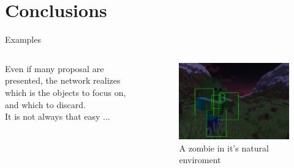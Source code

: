 \documentclass[english]{beamer}
\begin{document}
\section{Conclusions}
\begin{frame}{Examples}
	\begin{columns}
	    
	    \begin{column}{0.5\textwidth}
	    Even if many proposal are presented, the network realizes which is the objects to focus on, and which to discard. \\ 
               It is not always that easy ...
	
	    \end{column}
	
	    \begin{column}{0.5\textwidth}
	      \begin{figure}
	        \centering
	            \includegraphics[width=1.0\textwidth]{../images/sundered_zombie.png}
	            \caption{A zombie in it's natural enviroment}
	        \end{figure}
	    \end{column}
	  \end{columns}
\end{frame}
\end{document}
